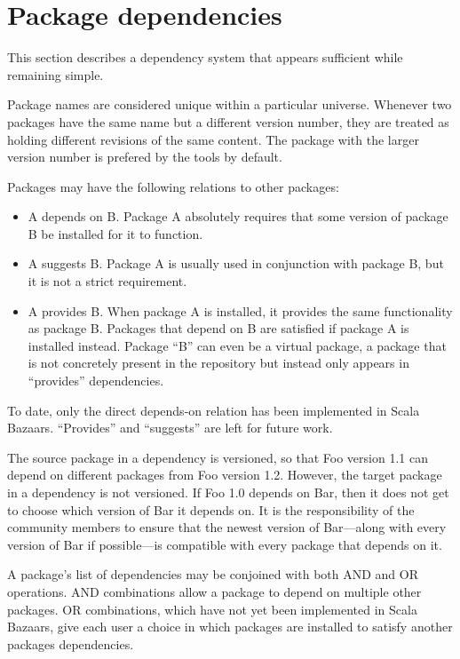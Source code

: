 \documentclass{article}
\begin{document}
\section{Package dependencies}

This section describes a dependency system that appears sufficient
while remaining simple.

Package names are considered unique within a particular universe.
Whenever two packages have the same name but a different version
number, they are treated as holding different revisions of the same
content.  The package with the larger version number is prefered by
the tools by default.

Packages may have the following relations to other packages:
\begin{itemize}
\item A depends on B.  Package A absolutely requires that some
      version of package B be installed for it to function.
\item A suggests B.  Package A is usually used in conjunction with
      package B, but it is not a strict requirement.
\item A provides B.  When package A is installed, it provides the same
      functionality as package B.  Packages that depend on B are
      satisfied if package A is installed instead.  Package ``B'' can
      even be a virtual package, a package that is not concretely present
      in the repository but instead only appears in ``provides'' dependencies.
\end{itemize}
To date, only the direct depends-on relation has been implemented in
Scala Bazaars.  ``Provides'' and ``suggests'' are left for future
work.

The source package in a dependency is versioned, so that Foo version
1.1 can depend on different packages from Foo version 1.2.  However,
the target package in a dependency is not versioned.  If Foo 1.0
depends on Bar, then it does not get to choose which version of Bar it
depends on.  It is the responsibility of the community members to
ensure that the newest version of Bar---along with every version of
Bar if possible---is compatible with every package that depends on it.

A package's list of dependencies may be conjoined with both AND and OR
operations.  AND combinations allow a package to depend on multiple
other packages.  OR combinations, which have not yet been implemented
in Scala Bazaars, give each user a choice in which packages are
installed to satisfy another packages dependencies.
\end{document}
